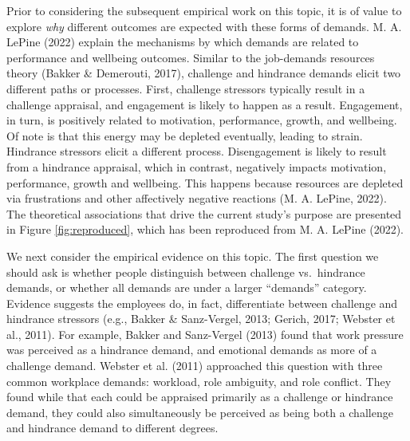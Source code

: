 \documentclass[
  man,mask]{apa6}
\begin{document}
Prior to considering the subsequent empirical work on this topic, it is of value to explore \emph{why} different outcomes are expected with these forms of demands. M. A. LePine (2022) explain the mechanisms by which demands are related to performance and wellbeing outcomes. Similar to the job-demands resources theory (Bakker \& Demerouti, 2017), challenge and hindrance demands elicit two different paths or processes. First, challenge stressors typically result in a challenge appraisal, and engagement is likely to happen as a result. Engagement, in turn, is positively related to motivation, performance, growth, and wellbeing. Of note is that this energy may be depleted eventually, leading to strain. Hindrance stressors elicit a different process. Disengagement is likely to result from a hindrance appraisal, which in contrast, negatively impacts motivation, performance, growth and wellbeing. This happens because resources are depleted via frustrations and other affectively negative reactions (M. A. LePine, 2022). The theoretical associations that drive the current study's purpose are presented in Figure \ref{fig:reproduced}, which has been reproduced from M. A. LePine (2022).

We next consider the empirical evidence on this topic. The first question we should ask is whether people distinguish between challenge vs.~hindrance demands, or whether all demands are under a larger ``demands'' category. Evidence suggests the employees do, in fact, differentiate between challenge and hindrance stressors (e.g., Bakker \& Sanz-Vergel, 2013; Gerich, 2017; Webster et al., 2011). For example, Bakker and Sanz-Vergel (2013) found that work pressure was perceived as a hindrance demand, and emotional demands as more of a challenge demand. Webster et al. (2011) approached this question with three common workplace demands: workload, role ambiguity, and role conflict. They found while that each could be appraised primarily as a challenge or hindrance demand, they could also simultaneously be perceived as being both a challenge and hindrance demand to different degrees.
\end{document}
